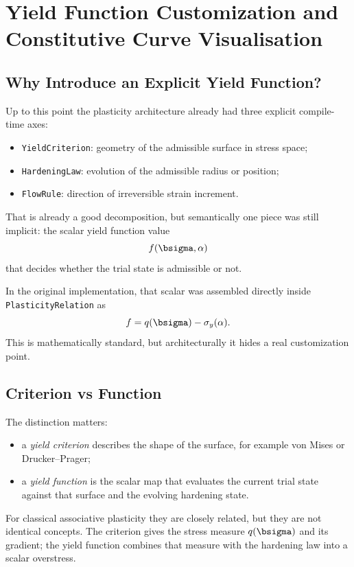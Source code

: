 \chapter{Yield Function Customization and Constitutive Curve Visualisation}

\section{Why Introduce an Explicit Yield Function?}

Up to this point the plasticity architecture already had three explicit
compile-time axes:

\begin{itemize}
  \item \texttt{YieldCriterion}: geometry of the admissible surface in stress
        space;
  \item \texttt{HardeningLaw}: evolution of the admissible radius or position;
  \item \texttt{FlowRule}: direction of irreversible strain increment.
\end{itemize}

That is already a good decomposition, but semantically one piece was still
implicit: the scalar yield function value
\[
f(\bsigma, \alpha)
\]
that decides whether the trial state is admissible or not.

In the original implementation, that scalar was assembled directly inside
\texttt{PlasticityRelation} as
\[
f = q(\bsigma) - \sigma_y(\alpha).
\]
This is mathematically standard, but architecturally it hides a real
customization point.

\section{Criterion vs Function}

The distinction matters:

\begin{itemize}
  \item a \emph{yield criterion} describes the shape of the surface, for
        example von Mises or Drucker--Prager;
  \item a \emph{yield function} is the scalar map that evaluates the current
        trial state against that surface and the evolving hardening state.
\end{itemize}

For classical associative plasticity they are closely related, but they are
not identical concepts.  The criterion gives the stress measure
\(q(\bsigma)\) and its gradient; the yield function combines that measure with
the hardening law into a scalar overstress.

